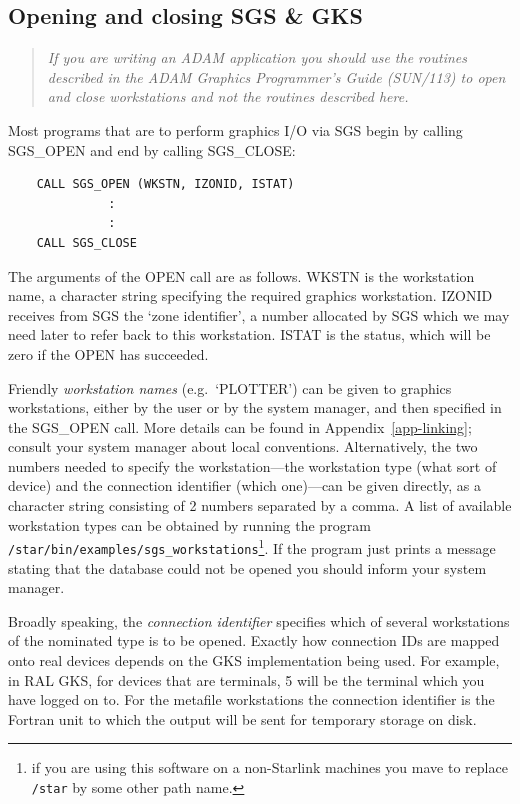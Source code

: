 \documentclass[11pt]{article}
\newcommand{\hyperref}[4]{#2\ref{#4}#3}
\newcommand{\htmlref}[2]{#1}
\newcommand{\xref}[3]{#1}
\begin{document}
\subsection {Opening and closing SGS \& GKS}\label{sec-op-cl}

\begin{quote}{\em 
If you are writing an ADAM application you should use the routines described 
in the ADAM Graphics Programmer's Guide (\xref{SUN/113}{sun113}{}) to open
and close workstations and not the routines described here.}
\end{quote}

Most programs that are to perform graphics I/O via SGS begin by calling
\htmlref{SGS\_OPEN}{SGS_OPEN} and end by calling 
\htmlref{SGS\_CLOSE}{SGS_CLOSE}:
\begin{verbatim}                                                  
    CALL SGS_OPEN (WKSTN, IZONID, ISTAT)
              :
              :
    CALL SGS_CLOSE
\end{verbatim}
The arguments of the OPEN call are as follows.
WKSTN is the workstation name, a character string specifying the required
graphics workstation.
IZONID receives from SGS the `\htmlref{zone}{zones} identifier', a number 
allocated by SGS which
we may need later to refer back to this workstation.
ISTAT is the status, which will be zero if the OPEN has succeeded.

Friendly {\em workstation names}\/ (e.g.\ `PLOTTER') can be given to graphics
workstations, either by the user or by the system manager, and then specified
in the SGS\_OPEN call.
More details can be found in 
\hyperref{this appendix}{Appendix~}{}{app-linking}; 
consult your 
system manager about local conventions.                                     
Alternatively, the two numbers needed to specify the workstation---the
workstation type (what sort of device) and the connection identifier (which 
one)---can be given directly, as a character string consisting of 2 numbers
separated by a comma.
A list of available workstation types can be obtained by running the program
{\tt /star/bin/examples/sgs\_workstations}\footnote{if you are using this 
software on a non-Starlink machines you mave to replace {\tt /star} by some
other path name.}. 
If the program just prints a message stating
that the database could not be opened you should inform your system manager.

Broadly speaking, the {\label{conid}\em{connection identifier}}\/
specifies which of several
workstations of the nominated type is to be opened.
Exactly how connection IDs are mapped onto real devices depends on the GKS
implementation being used.
For example, in RAL GKS, for devices that are terminals, 5 will be the
terminal which you have logged on to.
For the metafile workstations the connection identifier is the Fortran unit to
which the output will be sent for temporary storage on disk.
\end{document}
